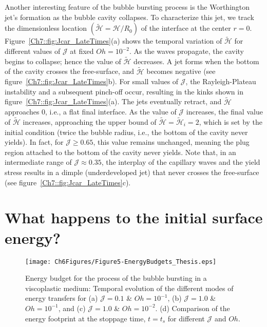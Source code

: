 Another interesting feature of the bubble bursting process is the Worthington jet's formation as the bubble cavity collapses. To characterize this jet, we track the dimensionless location $\left(\tilde{\mathcal{H}} = \mathcal{H}/R_0\right)$ of the interface at the center $r = 0$. 
Figure~\ref{Ch7::fig:Jcar_LateTimes}(a) shows the temporal variation of $\tilde{\mathcal{H}}$ for different values of $\mathcal{J}$ at fixed $Oh = 10^{-2}$. As the waves propagate, the cavity begins to collapse; hence the value of $\tilde{\mathcal{H}}$ decreases. A jet forms when the bottom of the cavity crosses the free-surface, and $\tilde{\mathcal{H}}$ becomes negative (see figure~\ref{Ch7::fig:Jcar_LateTimes}b). For small values of $\mathcal{J}$, the Rayleigh-Plateau instability and a subsequent pinch-off occur, resulting in the kinks shown in figure~\ref{Ch7::fig:Jcar_LateTimes}(a). The jets eventually retract, and $\tilde{\mathcal{H}}$ approaches $0$, i.e., a flat final interface. As the value of $\mathcal{J}$ increases, the final value of $\tilde{\mathcal{H}}$ increases, approaching the upper bound of $\tilde{\mathcal{H}} = \tilde{\mathcal{H}}_i = 2$, which is set by the initial condition (twice the bubble radius, i.e., the bottom of the cavity never yields). 
In fact, for $\mathcal{J} \ge 0.65$, this value remains unchanged, meaning the plug region attached to the bottom of the cavity never yields. Note that, in an intermediate range of $\mathcal{J} \approx 0.35$, the interplay of the capillary waves and the yield stress results in a dimple (underdeveloped jet) that never crosses the free-surface (see figure~\ref{Ch7::fig:Jcar_LateTimes}c). 

\section{What happens to the initial surface energy?}\label{Sec::Energy}

\begin{figure}
	\centering
	\texttt{[image: Ch6Figures/Figure5-EnergyBudgets\_Thesis.eps]}
	\caption{Energy budget for the process of the bubble bursting in a viscoplastic medium: Temporal evolution of the different modes of energy transfers for (a) $\mathcal{J} =0.1$ \& $Oh =10^{-1}$, (b) $\mathcal{J} = 1.0$ \& $Oh =10^{-1}$, and (c) $\mathcal{J} =1.0$ \& $Oh =10^{-2}$. (d) Comparison of the energy footprint at the stoppage time, $t = t_s$ for different $\mathcal{J}$ and $Oh$.}
	\label{Ch7::fig:EnergyBudget}
\end{figure}

